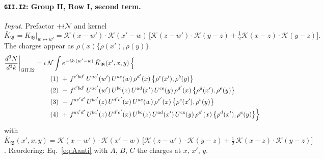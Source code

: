 \documentclass[10pt]{article}
\numberwithin{equation}{section}
\newcommand{\KK}{\mathcal K}
\newcommand{\NN}{\mathcal N}
\newcommand{\lab}[1]{\texttt{#1}}
\begin{document}
\paragraph{\lab{GII.I2}: Group II, Row I, second term.}
\emph{Input.} Prefactor $+i\NN$ and kernel
\begin{equation*}
\bar K_{\mathfrak B}=K_{\mathfrak B}\big|_{w\leftrightarrow w'}=\KK(x-w')\cdot\KK(x'-w)\,\big[\KK(z-w')\cdot\KK(y-z)+\tfrac12\KK(x-z)\cdot\KK(y-z)\big].
\end{equation*}
The charges appear as $\rho(x)\{\rho(x'),\rho(y)\}$.
\begin{align}
\frac{d^3N}{d^3k}\bigg|_{\rm GII.I2}={}&i\,\NN\int e^{-ik\cdot(w'-w)}\,\bar K_{\mathfrak B}(x',x,y)\,\Big\{\notag\\
&\quad (1)\ +\,f^{c'bd'}\,U^{ac'}(w')\,U^{ac}(w)\,\rho^{d'}(x)\,\big\{\rho^{c}(x'),\rho^{b}(y)\big\}\notag\\
&\quad (2)\ -\,f^{c'bd'}\,U^{ac'}(w')\,U^{bc}(z)\,U^{ad}(x')\,U^{ce}(y)\,\rho^{d'}(x)\,\big\{\rho^{d}(x'),\rho^{e}(y)\big\}\notag\\
&\quad (3)\ -\,f^{ac'd'}\,U^{bc'}(z)\,U^{d'e'}(x)\,U^{ac}(w)\,\rho^{e'}(x)\,\big\{\rho^{c}(x'),\rho^{b}(y)\big\}\notag\\
&\quad (4)\ +\,f^{ac'd'}\,U^{bc'}(z)\,U^{d'e'}(x)\,U^{bc}(z)\,U^{ad}(x')\,U^{ce}(y)\,\rho^{e'}(x)\,\big\{\rho^{d}(x'),\rho^{e}(y)\big\}\Big\}\label{eq:in-GII.I2}
\end{align}
with $\bar K_{\mathfrak B}(x',x,y)=\KK(x-w')\cdot\KK(x'-w)\,\Big[\KK(z-w')\cdot\KK(y-z)+\tfrac12\,\KK(x-z)\cdot\KK(y-z)\Big]$.
Reordering: Eq.~\eqref{eq:Aanti} with $A$, $B$, $C$ the charges at $x$, $x'$, $y$.
\end{document}
